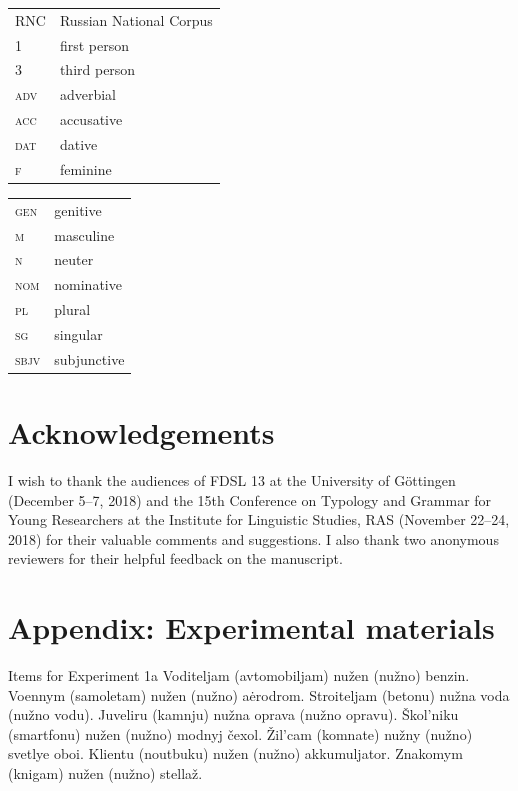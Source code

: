 \documentclass[output=paper,colorlinks,citecolor=brown]{langscibook}
\begin{document}
\begin{tabularx}{.5\textwidth}{@{}lX@{}}
RNC & Russian National Corpus\\
\textsc{1} & first person\\
\textsc{3} & third person\\
\textsc{adv} & adverbial\\
\textsc{acc} & accusative\\
\textsc{dat} & dative\\
\textsc{f} & feminine\\
\end{tabularx}
\begin{tabularx}{.5\textwidth}{@{}lX@{}}
\textsc{gen} & genitive\\
\textsc{m} & masculine\\
\textsc{n} & neuter\\
\textsc{nom} & nominative\\
\textsc{pl} & plural\\
\textsc{sg} & singular\\
\textsc{sbjv} & subjunctive\\ %
\end{tabularx}


\section*{Acknowledgements}

I wish to thank the audiences of FDSL 13 at the University of Göttingen (December 5--7, 2018) and the 15th Conference on Typology and Grammar for Young Researchers at the Institute for Linguistic Studies, RAS (November 22--24, 2018) for their valuable comments and suggestions. I also thank two anonymous reviewers for their helpful feedback on the manuscript.

\sloppy
\printbibliography[heading=subbibliography,notkeyword=this]

\section*{Appendix: Experimental materials}

\ea Items for Experiment 1a
\ea Voditeljam (avtomobiljam) nužen (nužno) benzin.
\ex  Voennym (samoletam) nužen (nužno) aėrodrom.
\ex  Stroiteljam (betonu) nužna voda (nužno vodu).
\ex  Juveliru (kamnju) nužna oprava (nužno opravu).
\ex  Škol'niku (smartfonu) nužen (nužno) modnyj čexol.
\ex  Žil'cam (komnate) nužny (nužno) svetlye oboi.
\ex  Klientu (noutbuku) nužen (nužno) akkumuljator.
\ex  Znakomym (knigam) nužen (nužno) stellaž.
\z \z
\end{document}
